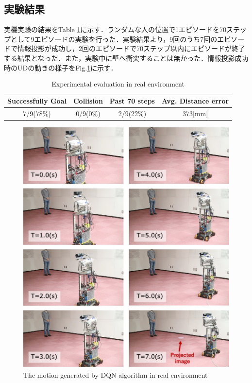 \documentclass[12pt]{sonota/aislab}
\begin{document}
\subsection{実験結果}
実機実験の結果をTable \ref{table:evaluation_real_world}に示す．ランダムな人の位置で1エピソードを70ステップとして9エピソードの実験を行った．実験結果より，9回のうち7回のエピソードで情報投影が成功し，2回のエピソードで70ステップ以内にエピソードが終了する結果となった．また，実験中に壁へ衝突することは無かった．情報投影成功時のUDの動きの様子をFig.\ref{real_experiment_motion}に示す．

\begin{table}[t]
	\caption{Experimental evaluation in real environment}
	\label{table:evaluation_real_world}
	\centering 
	\begin{tabular}[tbp]{|c|c|c|c|}
	    \hline
		Successfully Goal & Collision & Past 70 steps & Avg. Distance error \\\hline\hline
		7/9(78\%) & 0/9(0\%) & 2/9(22\%) & 373[mm] \\\hline
	\end{tabular}
\end{table}

\begin{figure}[t]
\begin{center}
\includegraphics[clip, width=13cm]{figs/real_experiment_motion.eps}
\caption{The motion generated by DQN algorithm in real environment}
\label{real_experiment_motion}
\end{center}
\end{figure}
\end{document}
